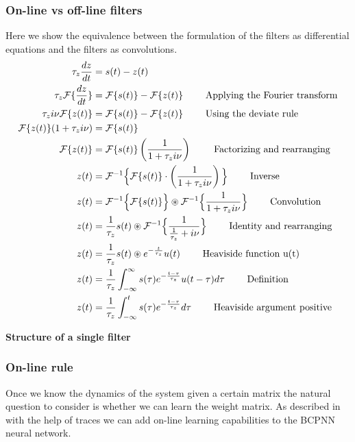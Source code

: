 \documentclass[10pt,a4paper]{article}
\begin{document}
\subsubsection{On-line vs off-line filters}
Here we show the equivalence between the formulation of the filters as differential equations and the filters as convolutions. 
\begin{align*}
\tau_z \dfrac{dz}{dt} &= s(t) - z(t) \\
\tau_z \mathcal{F}\{\dfrac{dz}{dt}\} &= \mathcal{F}\{s(t)\} -  \mathcal{F}\{ z(t) \}  \text{ \qquad Applying the Fourier transform} \\
\tau_z i \nu \mathcal{F}\{ z(t) \} &=  \mathcal{F}\{s(t)\} -  \mathcal{F}\{ z(t) \}  \text{ \qquad Using the deviate rule} \\
\mathcal{F}\{ z(t) \}(1 + \tau_z i \nu) &= \mathcal{F}\{s(t)\} \\ 
\mathcal{F}\{ z(t) \} &= \mathcal{F}\{s(t)\} \left(\frac{1}{1 +\tau_z i \nu } \right) \text{ \qquad Factorizing and rearranging} \\ 
z(t) &= \mathcal{F}^{-1} \Big\{ \mathcal{F}\{s(t)\} \cdot \left(\frac{1}{1 +\tau_z i \nu } \right) \Big\} \text{ \qquad Inverse}  \\ 
z(t) &= \mathcal{F}^{-1} \Big\{ \mathcal{F}\{s(t)\} \Big\} \circledast \mathcal{F}^{-1} \Big\{  \frac{1}{1 +\tau_z i \nu } \Big\} \text{ \qquad Convolution}  \\ 
z(t) &= \frac{1}{\tau_z } s(t) \circledast \mathcal{F}^{-1} \Big\{  \frac{1}{\frac{1}{\tau_z } + i \nu } \Big\} \text{ \qquad Identity and rearranging}  \\ 
z(t) &= \frac{1}{\tau_z } s(t) \circledast e^{-\frac{t}{\tau_z}}u(t)  \text{ \qquad Heaviside function u(t)}  \\ 
z(t) &= \frac{1}{\tau_z } \int_{-\infty}^{\infty} s(\tau) e^{-\frac{t - \tau}{\tau_z}}u(t - \tau) d\tau  \text{ \qquad Definition}  \\ 
z(t) &= \frac{1}{\tau_z } \int_{-\infty}^{t} s(\tau) e^{-\frac{t - \tau}{\tau_z}} d\tau  \text{ \qquad Heaviside argument positive}
\end{align*}

\textbf{Structure of a single filter}


\subsubsection{On-line rule}
Once we know the dynamics of the system given a certain matrix the natural question to consider is whether we can learn the weight matrix. As described in \cite{sandberg2002bayesian} with the help of traces we can add on-line learning capabilities to the BCPNN neural network. 
\end{document}
